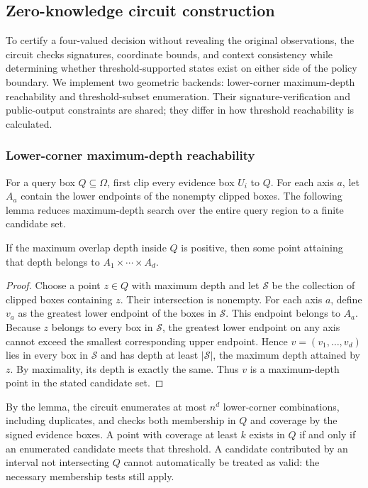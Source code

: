 \subsection{Zero-knowledge circuit construction}
To certify a four-valued decision without revealing the original observations, the circuit checks signatures, coordinate bounds, and context consistency while determining whether threshold-supported states exist on either side of the policy boundary. We implement two geometric backends: lower-corner maximum-depth reachability and threshold-subset enumeration. Their signature-verification and public-output constraints are shared; they differ in how threshold reachability is calculated.

\subsubsection{Lower-corner maximum-depth reachability}
For a query box $Q\subseteq\Omega$, first clip every evidence box $U_i$ to $Q$. For each axis $a$, let $A_a$ contain the lower endpoints of the nonempty clipped boxes. The following lemma reduces maximum-depth search over the entire query region to a finite candidate set.

\begin{lemma}\label{lem:corner}
If the maximum overlap depth inside $Q$ is positive, then some point attaining that depth belongs to $A_1\times\cdots\times A_d$.
\end{lemma}
\begin{proof}
Choose a point $z\in Q$ with maximum depth and let $\mathcal S$ be the collection of clipped boxes containing $z$. Their intersection is nonempty. For each axis $a$, define $v_a$ as the greatest lower endpoint of the boxes in $\mathcal S$. This endpoint belongs to $A_a$. Because $z$ belongs to every box in $\mathcal S$, the greatest lower endpoint on any axis cannot exceed the smallest corresponding upper endpoint. Hence $v=(v_1,\ldots,v_d)$ lies in every box in $\mathcal S$ and has depth at least $|\mathcal S|$, the maximum depth attained by $z$. By maximality, its depth is exactly the same. Thus $v$ is a maximum-depth point in the stated candidate set.
\end{proof}

By the lemma, the circuit enumerates at most $n^d$ lower-corner combinations, including duplicates, and checks both membership in $Q$ and coverage by the signed evidence boxes. A point with coverage at least $k$ exists in $Q$ if and only if an enumerated candidate meets that threshold. A candidate contributed by an interval not intersecting $Q$ cannot automatically be treated as valid: the necessary membership tests still apply.

